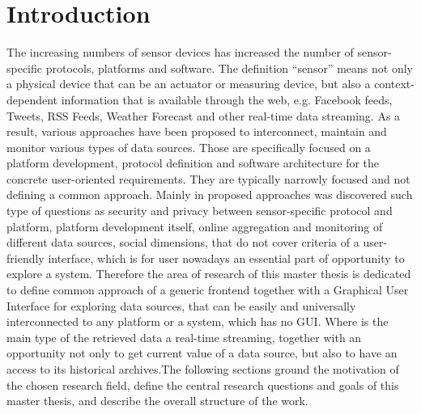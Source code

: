 
\chapter{Introduction}

  \begin{singlespace}
     The increasing numbers of sensor devices has increased the number of sensor-specific protocols, platforms and software. The definition ``sensor'' means not only a physical device that can be an actuator or measuring device, but also a context-dependent information that is available through the web, e.g. Facebook feeds, Tweets, RSS Feeds, Weather Forecast and other real-time data streaming. As a result, various approaches have been proposed to interconnect, maintain and monitor various types of data sources\cite{6588063,bendel2013service,song2010real}. Those are specifically focused on a platform development, protocol definition and software architecture for the concrete user-oriented requirements. They are typically narrowly focused and not defining a common approach. Mainly in proposed approaches was discovered such type of questions as security and privacy between sensor-specific protocol and platform, platform development itself, online aggregation and monitoring of different data sources, social dimensions\cite{eggert2013sensorcloud}, that do not cover criteria of a user-friendly interface, which is for user nowadays an essential part of opportunity to explore a system. Therefore the area of research of this master thesis is dedicated to define common approach of a generic frontend together with a Graphical User Interface for exploring data sources, that can be easily and universally interconnected to any platform or a system, which has no GUI. Where is the main type of the retrieved data a real-time streaming, together with an opportunity not only to get current value of a data source, but also to have an access to its historical archives.The following sections ground the motivation of the chosen research field, define the central research questions and goals of this master thesis, and describe the overall structure of the work.
  \end{singlespace}

